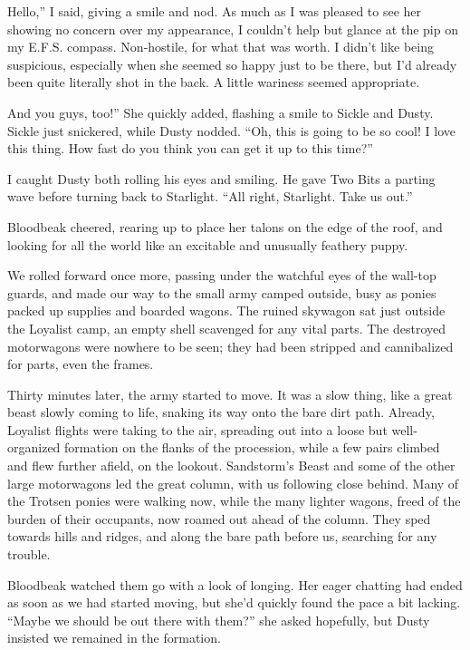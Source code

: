 \leavevmode{}Hello,” I said, giving a smile and nod. As much as I was pleased to see her showing no concern over my appearance, I couldn’t help but glance at the pip on my E.F.S. compass. Non-hostile, for what that was worth. I didn’t like being suspicious, especially when she seemed so happy just to be there, but I’d already been quite literally shot in the back. A little wariness seemed appropriate.

\leavevmode{}And you guys, too!” She quickly added, flashing a smile to Sickle and Dusty. Sickle just snickered, while Dusty nodded. “Oh, this is going to be so cool! I love this thing. How fast do you think you can get it up to this time?”

I caught Dusty both rolling his eyes and smiling. He gave Two Bits a parting wave before turning back to Starlight. “All right, Starlight. Take us out.”

Bloodbeak cheered, rearing up to place her talons on the edge of the roof, and looking for all the world like an excitable and unusually feathery puppy.

We rolled forward once more, passing under the watchful eyes of the wall-top guards, and made our way to the small army camped outside, busy as ponies packed up supplies and boarded wagons. The ruined skywagon sat just outside the Loyalist camp, an empty shell scavenged for any vital parts. The destroyed motorwagons were nowhere to be seen; they had been stripped and cannibalized for parts, even the frames.

Thirty minutes later, the army started to move. It was a slow thing, like a great beast slowly coming to life, snaking its way onto the bare dirt path. Already, Loyalist flights were taking to the air, spreading out into a loose but well-organized formation on the flanks of the procession, while a few pairs climbed and flew further afield, on the lookout. Sandstorm’s Beast and some of the other large motorwagons led the great column, with us following close behind. Many of the Trotsen ponies were walking now, while the many lighter wagons, freed of the burden of their occupants, now roamed out ahead of the column. They sped towards hills and ridges, and along the bare path before us, searching for any trouble.

Bloodbeak watched them go with a look of longing. Her eager chatting had ended as soon as we had started moving, but she’d quickly found the pace a bit lacking. “Maybe we should be out there with them?” she asked hopefully, but Dusty insisted we remained in the formation.

